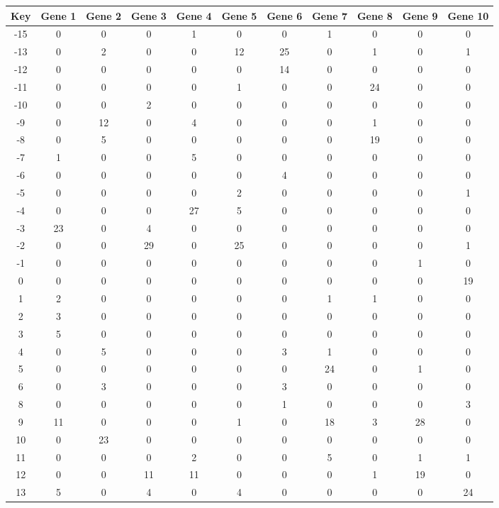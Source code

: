 \begin{tabular}{|c|c|c|c|c|c|c|c|c|c|c|}
\hline
Key & Gene 1 & Gene 2 & Gene 3 & Gene 4 & Gene 5 & Gene 6 & Gene 7 & Gene 8 & Gene 9 & Gene 10 \\
\hline
-15 & 0 & 0 & 0 & 1 & 0 & 0 & 1 & 0 & 0 & 0 \\
-13 & 0 & 2 & 0 & 0 & 12 & 25 & 0 & 1 & 0 & 1 \\
-12 & 0 & 0 & 0 & 0 & 0 & 14 & 0 & 0 & 0 & 0 \\
-11 & 0 & 0 & 0 & 0 & 1 & 0 & 0 & 24 & 0 & 0 \\
-10 & 0 & 0 & 2 & 0 & 0 & 0 & 0 & 0 & 0 & 0 \\
-9 & 0 & 12 & 0 & 4 & 0 & 0 & 0 & 1 & 0 & 0 \\
-8 & 0 & 5 & 0 & 0 & 0 & 0 & 0 & 19 & 0 & 0 \\
-7 & 1 & 0 & 0 & 5 & 0 & 0 & 0 & 0 & 0 & 0 \\
-6 & 0 & 0 & 0 & 0 & 0 & 4 & 0 & 0 & 0 & 0 \\
-5 & 0 & 0 & 0 & 0 & 2 & 0 & 0 & 0 & 0 & 1 \\
-4 & 0 & 0 & 0 & 27 & 5 & 0 & 0 & 0 & 0 & 0 \\
-3 & 23 & 0 & 4 & 0 & 0 & 0 & 0 & 0 & 0 & 0 \\
-2 & 0 & 0 & 29 & 0 & 25 & 0 & 0 & 0 & 0 & 1 \\
-1 & 0 & 0 & 0 & 0 & 0 & 0 & 0 & 0 & 1 & 0 \\
0 & 0 & 0 & 0 & 0 & 0 & 0 & 0 & 0 & 0 & 19 \\
1 & 2 & 0 & 0 & 0 & 0 & 0 & 1 & 1 & 0 & 0 \\
2 & 3 & 0 & 0 & 0 & 0 & 0 & 0 & 0 & 0 & 0 \\
3 & 5 & 0 & 0 & 0 & 0 & 0 & 0 & 0 & 0 & 0 \\
4 & 0 & 5 & 0 & 0 & 0 & 3 & 1 & 0 & 0 & 0 \\
5 & 0 & 0 & 0 & 0 & 0 & 0 & 24 & 0 & 1 & 0 \\
6 & 0 & 3 & 0 & 0 & 0 & 3 & 0 & 0 & 0 & 0 \\
8 & 0 & 0 & 0 & 0 & 0 & 1 & 0 & 0 & 0 & 3 \\
9 & 11 & 0 & 0 & 0 & 1 & 0 & 18 & 3 & 28 & 0 \\
10 & 0 & 23 & 0 & 0 & 0 & 0 & 0 & 0 & 0 & 0 \\
11 & 0 & 0 & 0 & 2 & 0 & 0 & 5 & 0 & 1 & 1 \\
12 & 0 & 0 & 11 & 11 & 0 & 0 & 0 & 1 & 19 & 0 \\
13 & 5 & 0 & 4 & 0 & 4 & 0 & 0 & 0 & 0 & 24 \\
\hline
\end{tabular}